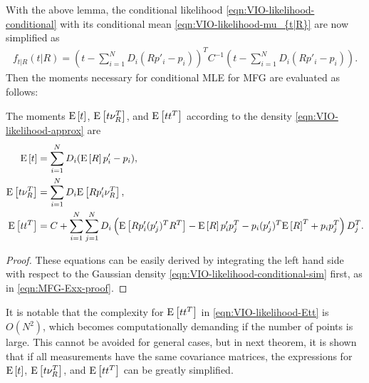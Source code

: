 With the above lemma, the conditional likelihood \eqref{eqn:VIO-likelihood-conditional} with its conditional mean \eqref{eqn:VIO-likelihood-mu_{t|R}} are now simplified as
\begin{align} \label{eqn:VIO-likelihood-conditional-sim}
	f_{t|R}(t|R) = \left( t - \sum_{i=1}^N D_i(Rp'_i - p_i) \right)^T C^{-1} \left( t - \sum_{i=1}^N D_i(Rp'_i - p_i) \right).
\end{align}
Then the moments necessary for conditional MLE for MFG are evaluated as follows:

\begin{theorem} \label{thm:VIO-conditional}
	The moments $\mathrm{E}\left[ t \right]$, $\mathrm{E}\left[ t\nu_R^T \right]$, and $\mathrm{E}\left[ tt^T \right]$ according to the density \eqref{eqn:VIO-likelihood-approx} are
	\begin{align}
		\mathrm{E}\left[ t \right] &= \sum_{i=1}^N D_i(\mathrm{E}\left[ R \right]p'_i-p_i), \\
		\mathrm{E}\left[ t\nu_R^T \right] &= \sum_{i=1}^N D_i \mathrm{E}\left[ Rp'_i\nu_R^T \right], \\
		\mathrm{E}\left[ tt^T \right] &= C + \sum_{i=1}^N \sum_{j=1}^N D_i \left( \mathrm{E}\left[ Rp'_i(p'_j)^TR^T \right] - \mathrm{E}\left[ R \right]p'_ip_j^T - p_i(p'_j)^T\mathrm{E}\left[ R \right]^T + p_ip_j^T \right) D_j^T. \label{eqn:VIO-likelihood-Ett}
	\end{align}
\end{theorem}
\begin{proof}
	These equations can be easily derived by integrating the left hand side with respect to the Gaussian density \eqref{eqn:VIO-likelihood-conditional-sim} first, as in \eqref{eqn:MFG-Exx-proof}.
\end{proof}

It is notable that the complexity for $\mathrm{E}\left[ tt^T \right]$ in \eqref{eqn:VIO-likelihood-Ett} is $O(N^2)$, which becomes computationally demanding if the number of points is large.
This cannot be avoided for general cases, but in next theorem, it is shown that if all measurements have the same covariance matrices, the expressions for $\mathrm{E}\left[ t \right]$, $\mathrm{E}\left[ t\nu_R^T \right]$, and $\mathrm{E}\left[ tt^T \right]$ can be greatly simplified.

